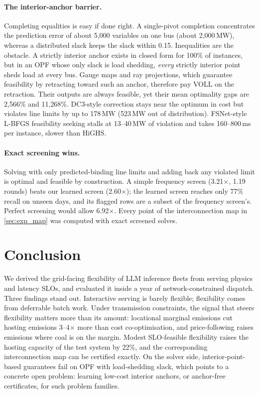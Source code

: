\documentclass{article} %
\begin{document}
\paragraph{The interior-anchor barrier.} Completing equalities is easy if done right. A single-pivot completion concentrates the prediction error of about 5{,}000 variables on one bus (about 2{,}000\,MW), whereas a distributed slack keeps the slack within 0.15. Inequalities are the obstacle. A strictly interior anchor exists in closed form for 100\% of instances, but in an OPF whose only slack is load shedding, \emph{every} strictly interior point sheds load at every bus. Gauge maps and ray projections, which guarantee feasibility by retracting toward such an anchor, therefore pay VOLL on the retraction. Their outputs are always feasible, yet their mean optimality gaps are 2{,}566\% and 11{,}268\%. DC3-style correction stays near the optimum in cost but violates line limits by up to 178\,MW (523\,MW out of distribution). FSNet-style L-BFGS feasibility seeking stalls at 13--40\,MW of violation and takes 160--800\,ms per instance, slower than HiGHS.

\paragraph{Exact screening wins.} Solving with only predicted-binding line limits and adding back any violated limit is optimal and feasible by construction. A simple frequency screen (3.21$\times$, 1.19 rounds) beats our learned screen (2.60$\times$); the learned screen reaches only 77\% recall on unseen days, and its flagged rows are a subset of the frequency screen's. Perfect screening would allow 6.92$\times$. Every point of the interconnection map in \cref{sec:exp_map} was computed with exact screened solves.

\FloatBarrier
\section{Conclusion}
\label{sec:conclusion}
We derived the grid-facing flexibility of LLM inference fleets from serving physics and latency SLOs, and evaluated it inside a year of network-constrained dispatch. Three findings stand out. Interactive serving is barely flexible; flexibility comes from deferrable batch work. Under transmission constraints, the signal that steers flexibility matters more than its amount: locational marginal emissions cut hosting emissions 3--4$\times$ more than cost co-optimisation, and price-following raises emissions where coal is on the margin. Modest SLO-feasible flexibility raises the hosting capacity of the test system by 22\%, and the corresponding interconnection map can be certified exactly. On the solver side, interior-point-based guarantees fail on OPF with load-shedding slack, which points to a concrete open problem: learning low-cost interior anchors, or anchor-free certificates, for such problem families.
\end{document}
